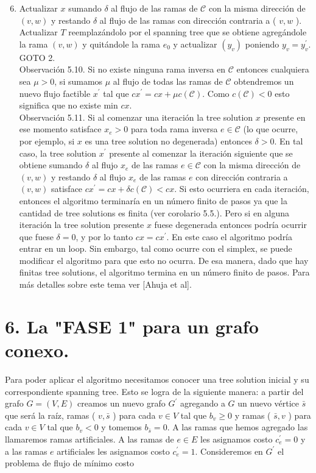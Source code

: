 \documentclass[10pt]{article}
\begin{document}
\begin{enumerate}
  \setcounter{enumi}{5}
  \item Actualizar $x$ sumando $\delta$ al flujo de las ramas de $\mathcal{C}$ con la misma dirección de $(v, w)$ y restando $\delta$ al flujo de las ramas con dirección contraria a ( $v, w$ ). Actualizar $T$ reemplazándolo por el spanning tree que se obtiene agregándole la rama $(v, w)$ y quitándole la rama $e_{0}$ y actualizar $\left(y_{v}\right)$ poniendo $y_{v}=y_{v}^{\prime}$. GOTO 2.\\
Observación 5.10. Si no existe ninguna rama inversa en $\mathcal{C}$ entonces cualquiera sea $\mu>0$, si sumamos $\mu$ al flujo de todas las ramas de $\mathcal{C}$ obtendremos un nuevo flujo factible $x^{\prime}$ tal que $c x^{\prime}=c x+\mu c(\mathcal{C})$. Como $c(\mathcal{C})<0$ esto significa que no existe min $c x$.\\
Observación 5.11. Si al comenzar una iteración la tree solution $x$ presente en ese momento satisface $x_{e}>0$ para toda rama inversa $e \in \mathcal{C}$ (lo que ocurre, por ejemplo, si $x$ es una tree solution no degenerada) entonces $\delta>0$. En tal caso, la tree solution $x^{\prime}$ presente al comenzar la iteración siguiente que se obtiene sumando $\delta$ al flujo $x_{e}$ de las ramas $e \in \mathcal{C}$ con la misma dirección de $(v, w)$ y restando $\delta$ al flujo $x_{e}$ de las ramas $e$ con dirección contraria a $(v, w)$ satisface $c x^{\prime}=c x+\delta c(\mathcal{C})<c x$. Si esto ocurriera en cada iteración, entonces el algoritmo terminaría en un número finito de pasos ya que la cantidad de tree solutions es finita (ver corolario 5.5.). Pero si en alguna iteración la tree solution presente $x$ fuese degenerada entonces podría ocurrir que fuese $\delta=0$, y por lo tanto $c x=c x^{\prime}$. En este caso el algoritmo podría entrar en un loop. Sin embargo, tal como ocurre con el simplex, se puede modificar el algoritmo para que esto no ocurra. De esa manera, dado que hay finitas tree solutions, el algoritmo termina en un número finito de pasos. Para más detalles sobre este tema ver [Ahuja et al].
\end{enumerate}

\section*{6. La "FASE 1" para un grafo conexo.}
Para poder aplicar el algoritmo necesitamos conocer una tree solution inicial y su correspondiente spanning tree. Esto se logra de la siguiente manera: a partir del grafo $G=(V, E)$ creamos un nuevo grafo $G^{\prime}$ agregando a $G$ un nuevo vértice $\bar{s}$ que será la raíz, ramas ( $v, \bar{s}$ ) para cada $v \in V$ tal que $b_{v} \geq 0$ y ramas ( $\bar{s}, v$ ) para cada $v \in V$ tal que $b_{v}<0$ y tomemos $b_{\bar{s}}=0$. A las ramas que hemos agregado las llamaremos ramas artificiales. A las ramas de $e \in E$ les asignamos costo $c_{e}^{\prime}=0$ y a las ramas $e$ artificiales les asignamos costo $c_{e}^{\prime}=1$. Consideremos en $G^{\prime}$ el problema de flujo de mínimo costo
\end{document}
